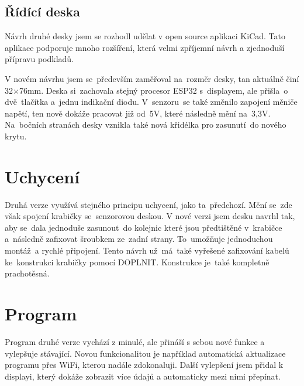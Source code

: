 \subsection{Řídící deska}
Návrh druhé desky jsem se rozhodl udělat v open source aplikaci KiCad.
Tato aplikace podporuje mnoho rozšíření, která velmi zpříjemní návrh a zjednoduší přípravu podkladů.

V novém návrhu jsem se~především zaměřoval na~rozměr desky, tan aktuálně činí 32$\times$76mm.
Deska si~zachovala stejný procesor ESP32 s~displayem, ale přišla~o dvě~tlačítka a~jednu indikační diodu.
V~senzoru~se také změnilo zapojení měniče napětí, ten nově dokáže pracovat již od~5V, které následně mění na~3,3V.
Na~bočních stranách desky vznikla také nová křidélka pro zasunutí~do nového krytu.

\fxnote[author=JA]{\textcolor{mygreen}{krabička popis, uchycení}}
\fxnote[author=JA]{\textcolor{mygreen}{Obrázek deksa => krabička}}

\section{Uchycení}
Druhá verze využívá stejného principu uchycení, jako ta~předchozí. 
Mění se~zde však spojení krabičky se~senzorovou deskou. 
V nové verzi jsem desku navrhl tak, aby se~dala jednoduše zasunout~do kolejnic které jsou předtištěné v~krabičce a~následně zafixovat šroubkem ze~zadní strany.
To~umožňuje jednoduchou montáž~a rychlé připojení.
Tento návrh už~má~také vyřešené zafixování kabelů ke~konstrukci krabičky pomocí \textcolor{mygreen}{DOPLNIT}.
Konstrukce je~také kompletně prachotěsná.


\section{Program}
Program druhé verze vychází z minulé, ale přináší s sebou nové funkce a vylepšuje stávající.
Novou funkcionalitou je například automatická aktualizace programu přes WiFi, kterou nadále zdokonaluji.
Další vylepšení jsem přidal k displayi, který dokáže zobrazit více údajů a automaticky mezi nimi přepínat.
\newpage